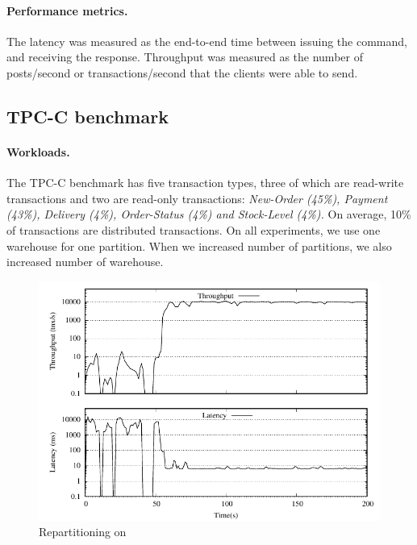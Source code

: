 \paragraph*{Performance metrics.}
%
The latency was measured as the end-to-end time between issuing the
command, and receiving the response.  Throughput was measured as the
number of posts/second or transactions/second that the clients were able to send.

\subsection{TPC-C benchmark}
\label{sec:evaluation:tpc-c}

\paragraph*{Workloads.}
The TPC-C benchmark has five transaction types, three of which are read-write 
transactions and two are read-only transactions: \textit{New-Order (45\%), Payment (43\%), Delivery
(4\%), Order-Status (4\%) and Stock-Level (4\%).} On average, 10\%
of transactions are distributed transactions. On all experiments, we use one warehouse for
one partition. When we increased number of partitions, we also increased number
of warehouse.

\begin{figure}[ht!]
  \centering
    \includegraphics[width=\columnwidth]{figures/experiments/tpcc-repartitioning/tpcc-repartitioning}
  \caption{Repartitioning on \dynastar}
  \label{fig:tpcc_repartitioning}
\end{figure}

